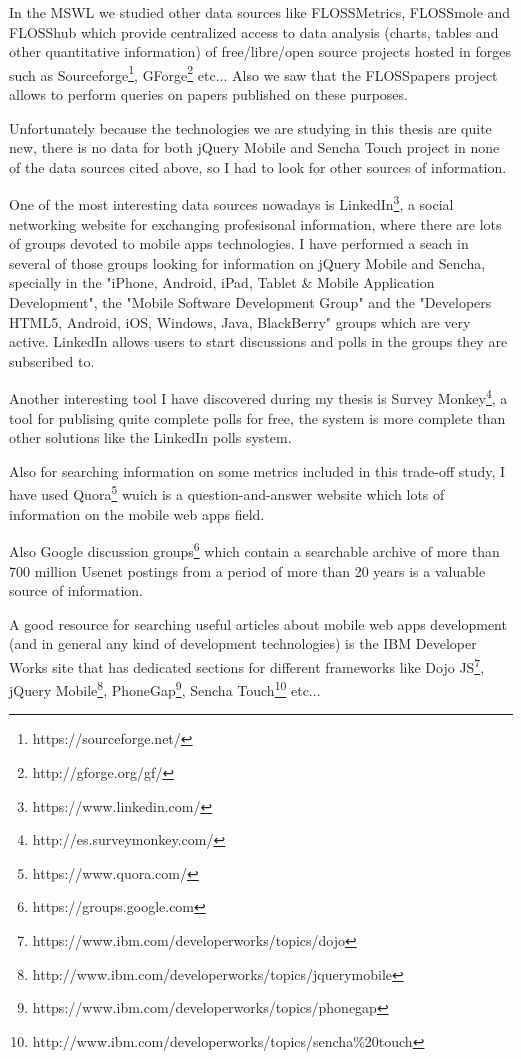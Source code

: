 \documentclass[a4paper,12pt]{book}
\begin{document}
In the MSWL we studied other data sources like FLOSSMetrics\cite{FLOSSMetrics}, FLOSSmole\cite{FLOSSmole} and FLOSShub\cite{FLOSShub} which provide centralized access to data analysis (charts, tables and other quantitative information) of free/libre/open source projects hosted in forges such as Sourceforge\footnote{https://sourceforge.net/}, GForge\footnote{http://gforge.org/gf/} etc... Also we saw that the FLOSSpapers project\cite{FLOSSpapers} allows to perform queries on papers published on these purposes.

Unfortunately because the technologies we are studying in this thesis are quite new, there is no data for both jQuery Mobile and Sencha Touch project in none of the data sources cited above, so I had to look for other sources of information.

One of the most interesting data sources nowadays is LinkedIn\footnote{https://www.linkedin.com/},  a social networking website for exchanging profesisonal information, where there are lots of groups devoted to mobile apps technologies. I have performed a seach in several of those groups looking for information on jQuery Mobile and Sencha, specially in the "iPhone, Android, iPad, Tablet \& Mobile Application Development"\cite{linkedin1},  the "Mobile Software Development Group"\cite{linkedin2} and the "Developers HTML5, Android, iOS, Windows, Java, BlackBerry"\cite{linkedin3} groups which are very active. LinkedIn allows users to start discussions and polls in the groups they are subscribed to. 

Another interesting tool I have discovered during my thesis is Survey Monkey\footnote{http://es.surveymonkey.com/}, a tool for publising quite complete polls for free, the system is more complete than other solutions like the LinkedIn polls system.

Also for searching information on some metrics included in this trade-off study, I have used Quora\footnote{https://www.quora.com/}  wuich is a question-and-answer website which lots of information on the mobile web apps field.

Also Google discussion groups\footnote{https://groups.google.com} which contain a searchable archive of more than 700 million Usenet postings from a period of more than 20 years is a valuable source of information.

A good resource for searching useful articles about mobile web apps development (and in general any kind of development technologies) is the IBM Developer Works site that has dedicated sections for different frameworks like Dojo JS\footnote{https://www.ibm.com/developerworks/topics/dojo}, jQuery Mobile\footnote{http://www.ibm.com/developerworks/topics/jquerymobile}, PhoneGap\footnote{https://www.ibm.com/developerworks/topics/phonegap}, Sencha Touch\footnote{http://www.ibm.com/developerworks/topics/sencha\%20touch}  etc...	 
\end{document}
